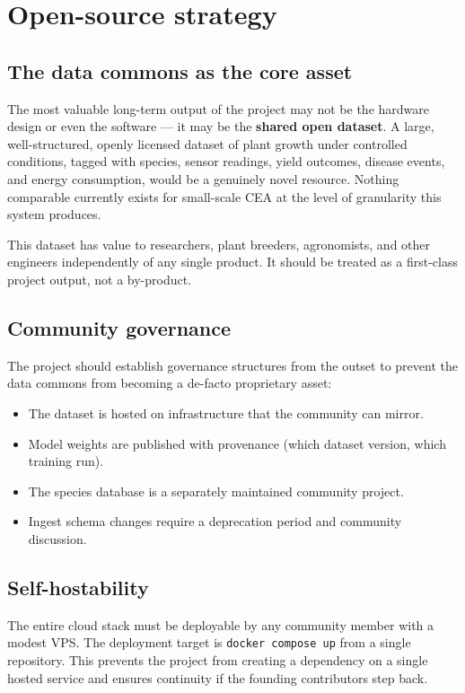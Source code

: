 \section{Open-source strategy}

\subsection{The data commons as the core asset}

The most valuable long-term output of the project may not be the hardware design or even the software --- it may be the \textbf{shared open dataset}. A large, well-structured, openly licensed dataset of plant growth under controlled conditions, tagged with species, sensor readings, yield outcomes, disease events, and energy consumption, would be a genuinely novel resource. Nothing comparable currently exists for small-scale CEA at the level of granularity this system produces.

This dataset has value to researchers, plant breeders, agronomists, and other engineers independently of any single product. It should be treated as a first-class project output, not a by-product.

\subsection{Community governance}

The project should establish governance structures from the outset to prevent the data commons from becoming a de-facto proprietary asset:

\begin{itemize}
  \item The dataset is hosted on infrastructure that the community can mirror.
  \item Model weights are published with provenance (which dataset version, which training run).
  \item The species database is a separately maintained community project.
  \item Ingest schema changes require a deprecation period and community discussion.
\end{itemize}

\subsection{Self-hostability}

The entire cloud stack must be deployable by any community member with a modest VPS. The deployment target is \texttt{docker compose up} from a single repository. This prevents the project from creating a dependency on a single hosted service and ensures continuity if the founding contributors step back.


